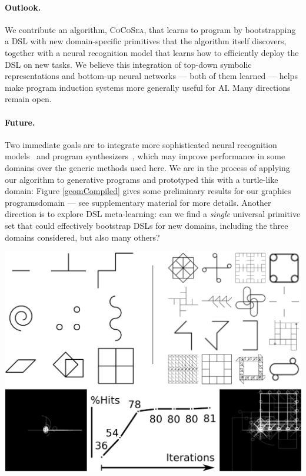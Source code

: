 \documentclass{article}
\newcommand{\systemEnding}{\textsc{CoCoSea}}
\begin{document}
\parbox{0.58\textwidth}{

\paragraph{Outlook.}
We contribute an algorithm, \systemEnding, that learns to program by
bootstrapping a DSL with new domain-specific primitives that the algorithm
itself discovers, together with a neural recognition model that learns how to
efficiently deploy the DSL on new tasks. We believe this integration of top-down
symbolic representations and bottom-up neural networks --- both of them learned
--- helps make program induction systems more generally useful for AI. Many
directions remain open.

\paragraph{Future.}
Two immediate goals are to integrate more sophisticated neural recognition
models~\cite{devlin2017robustfill} and program
synthesizers~\cite{solar2008program}, which may improve performance in some
domains over the generic methods used here.
We are in the process of applying our algorithm to generative programs and
prototyped this with a turtle-like domain: Figure \ref{geomCompiled} gives some
preliminary results for our graphics programsdomain --- see supplementary material for more
details.  Another direction is to explore DSL meta-learning: can we find a
\emph{single} universal primitive set that could effectively bootstrap DSLs for
new domains, including the three domains considered,  but also many others?
}\hfill
\begin{minipage}{0.4\textwidth}
  \centering
  \includegraphics[width=\textwidth]{figures/geomCompiled.eps} 
\label{geomCompiled}
\end{minipage}


{\small }
\end{document}
